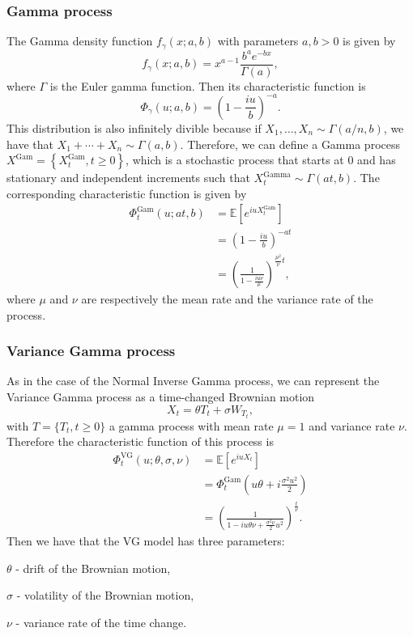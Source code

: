 \subsubsection*{Gamma process}
The Gamma density function $f_\gamma(x;a,b)$ with parameters $a,b>0$ is given by
$$f_\gamma (x;a,b) = x^{a-1}\frac{b^a e^{-bx}}{\Gamma(a)},$$
where $\Gamma$ is the Euler gamma function. Then its characteristic function is
$$\Phi_\gamma(u;a,b)=\left(1-\frac{iu}{b}\right)^{-a}.$$
This distribution is also infinitely divible because if $X_1,\ldots,X_n\sim\Gamma(a/n,b)$, we have that $X_1+\cdots+X_n\sim\Gamma(a,b)$. Therefore, we can define a Gamma process $X^\text{Gam}=\left\{X_t^\text{Gam},t\geq0\right\}$, which is a stochastic process that starts at 0 and has stationary and independent increments such that $X_t^\text{Gamma}\sim\Gamma(at,b)$. The corresponding characteristic function is given by
\begin{align*}
\Phi_t^\text{Gam}(u;at,b) &=\mathbb{E}\left[e^{iuX_t^\text{Gam}}\right]\\
&= \left(1-\frac{iu}{b}\right)^{-at}\\
&= \left(\frac{1}{1-\frac{iu\nu}{\mu}}\right)^{\frac{\mu^2}{\nu}t},
\end{align*}
where $\mu$ and $\nu$ are respectively the mean rate and the variance rate of the process.

\subsubsection*{Variance Gamma process}
As in the case of the Normal Inverse Gamma process, we can represent the Variance Gamma process as a time-changed Brownian motion
$$X_t = \theta T_t +\sigma W_{T_t},$$
with $T=\{T_t,t\geq0\}$ a gamma process with mean rate $\mu=1$ and variance rate $\nu$. Therefore the characteristic function of this process is
\begin{align}\label{eq:VG_CF1}
\Phi_t^{\text{VG}}(u;\theta,\sigma,\nu)&=\mathbb{E}\left[e^{iuX_t}\right]\nonumber\\
&=\Phi_t^\text{Gam}\left(u\theta+i\frac{\sigma^2u^2}{2}\right)\nonumber\\
&= \left(\frac{1}{1-iu\theta\nu+\frac{\sigma^2\nu}{2}u^2}\right)^{\frac{t}{\nu}}.
\end{align}
Then we have that the VG model has three parameters:
\begin{my_list_item}
\item $\theta$ - drift of the Brownian motion,
\item $\sigma$ - volatility of the Brownian motion,
\item $\nu$ - variance rate of the time change.
\end{my_list_item}


